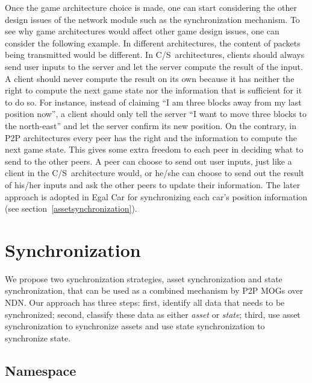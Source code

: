\documentclass{article}
\newcommand{\cs}{C\slash S}
\begin{document}
Once the game architecture choice is made, one can start considering the other design issues of the network module such as the synchronization mechanism. To see why game architectures would affect other game design issues, one can consider the following example. In different architectures, the content of packets being transmitted would be different. In \cs~architectures, clients should always send user inputs to the server and let the server compute the result of the input. A client should never compute the result on its own because it has neither the right to compute the next game state nor the information that is sufficient for it to do so. For instance, instead of claiming ``I am three blocks away from my last position now'', a client should only tell the server ``I want to move three blocks to the north-east'' and let the server confirm its new position. On the contrary, in P2P architectures every peer has the right and the information to compute the next game state. This gives some extra freedom to each peer in deciding what to send to the other peers. A peer can choose to send out user inputs, just like a client in the \cs~architecture would, or he/she can choose to send out the result of his/her inputs and ask the other peers to update their information. The later approach is adopted in Egal Car for synchronizing each car's position information (see section~\ref{assetsynchronization}).

\section{Synchronization}
\label{synchronization}

We propose two synchronization strategies, asset synchronization and state synchronization, that can be used as a combined mechanism by P2P MOGs over NDN. Our approach has three steps: first, identify all data that needs to be synchronized; second, classify these data as either \emph{asset} or \emph{state}; third, use asset synchronization to synchronize assets and use state synchronization to synchronize state.

\subsection{Namespace}
\label{namespace}
\end{document}
